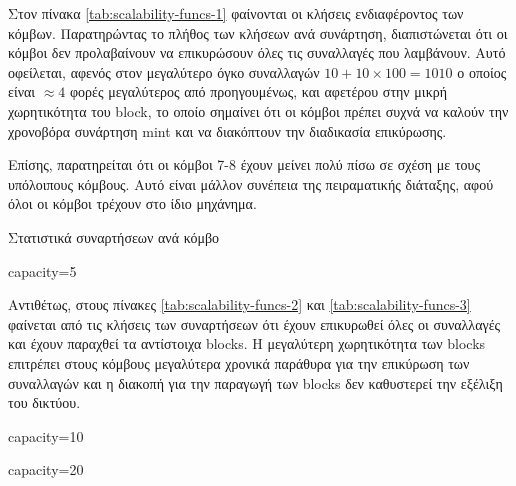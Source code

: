 \documentclass{article}
\newcommand{\eng}[1]{\foreignlanguage{english}{#1}} %
\begin{document}
Στον πίνακα \ref{tab:scalability-funcs-1} φαίνονται οι κλήσεις ενδιαφέροντος
των κόμβων. Παρατηρώντας το πλήθος των κλήσεων ανά συνάρτηση, διαπιστώνεται ότι
οι κόμβοι δεν προλαβαίνουν να επικυρώσουν όλες τις συναλλαγές που λαμβάνουν.
Αυτό οφείλεται, αφενός στον μεγαλύτερο όγκο συναλλαγών $10 + 10 \times 100 =
1010$ ο οποίος είναι $\approx 4$ φορές μεγαλύτερος από προηγουμένως, και
αφετέρου στην μικρή χωρητικότητα του \eng{block}, το οποίο σημαίνει ότι οι
κόμβοι πρέπει συχνά να καλούν την χρονοβόρα συνάρτηση \eng{mint} και να
διακόπτουν την διαδικασία επικύρωσης.

Επίσης, παρατηρείται ότι οι κόμβοι 7-8 έχουν μείνει πολύ πίσω σε σχέση
με τους υπόλοιπους κόμβους. Αυτό είναι μάλλον συνέπεια της πειραματικής
διάταξης, αφού όλοι οι κόμβοι τρέχουν στο ίδιο μηχάνημα.

\begin{table}[ht]
    \caption{Στατιστικά συναρτήσεων ανά κόμβο}
    \label{tab:scalability-funcs}
    \begin{subtable}{\textwidth}
        \centering
        \caption{\eng{capacity=5}}
        \label{tab:scalability-funcs-1}
    \end{subtable}
\end{table}

Αντιθέτως, στους πίνακες \ref{tab:scalability-funcs-2} και \ref{tab:scalability-funcs-3}
φαίνεται από τις κλήσεις των συναρτήσεων ότι έχουν επικυρωθεί όλες οι συναλλαγές
και έχουν παραχθεί τα αντίστοιχα \eng{blocks}. Η μεγαλύτερη χωρητικότητα των
\eng{blocks} επιτρέπει στους κόμβους μεγαλύτερα χρονικά παράθυρα για την
επικύρωση των συναλλαγών και η διακοπή για την παραγωγή των \eng{blocks} δεν
καθυστερεί την εξέλιξη του δικτύου.

\begin{table}[ht]
    \ContinuedFloat
    \begin{subtable}{0.45\textwidth}
        \centering
        \caption{\eng{capacity=10}}
        \label{tab:scalability-funcs-2}
    \end{subtable}
    \hfill
    \begin{subtable}{0.45\textwidth}
        \centering
        \caption{\eng{capacity=20}}
        \label{tab:scalability-funcs-3}
    \end{subtable}
\end{table}
\FloatBarrier
\end{document}
